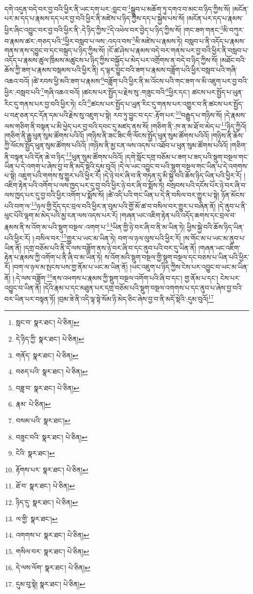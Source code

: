 དགེ་འདུན་བདེ་བར་བྱ་བའི་ཕྱིར་ནི་ཡང་དག་པར་:བླང་བ་\footnote{སླང་བ་  སྣར་ཐང་།  པེ་ཅིན། }སྒྲུབ་པ་མཆོག་ཏུ་དགའ་བ་མང་བ་ཉིད་ཀྱིས་སོ། །མངོན་པར་མ་དད་པ་རྣམས་དད་པར་བྱ་བའི་ཕྱིར་ནི་མཛེས་པ་ཉིད་ཀྱིས་དད་པ་སྐྱེས་པས་སོ། །མངོན་པར་དད་པ་རྣམས་ཕྱིར་ཞིང་འབྱུང་བར་བྱ་བའི་ཕྱིར་ནི་:དེ་ཉིད་ཀྱིས་\footnote{དེ་ཉིད་ཀྱི་  སྣར་ཐང་།  པེ་ཅིན། }དེ་འཕེལ་བར་བྱེད་པ་ཉིད་ཀྱིས་སོ། །གང་ཟག་གནང་\footnote{གནོད་  སྣར་ཐང་།  པེ་ཅིན། }མི་བཀུར་བ་རྣམས་ཚར་:གཅད་པའི་\footnote{བཅད་པའི་  སྣར་ཐང་།  པེ་ཅིན། }ཕྱིར་བསླབ་པ་ལས་:འདའ་བས་\footnote{བཟླ་བ་  སྣར་ཐང་།  པེ་ཅིན། }མི་མཛེས་པ་རྣམས་ཏེ། བསླབ་པ་ནི་འདོད་པ་རྣམས་གནས་ནས་དབྱུང་བ་དང་བསྐྲད་པ་ཉིད་ཀྱིས་སོ། །ངོ་ཚ་ཤེས་པ་རྣམས་བདེ་བར་གནས་པར་བྱ་བའི་ཕྱིར་ནི་བསླབ་པ་འདོད་པ་རྣམས་ཚུལ་ཁྲིམས་མཚུངས་པ་ཉིད་ཀྱིས་བསྐྱོད་པ་མེད་པར་འགྲོགས་ན་བདེ་བ་ཉིད་ཀྱིས་སོ། །མཐོང་བའི་ཆོས་ཀྱི་ཟག་པ་རྣམས་བསྡམས་པའི་ཕྱིར་ནི། ད་ལྟར་བྱུང་བའི་ཟག་པ་རྣམས་བཟློག་པའི་ཕྱིར་བསླབ་པའི་གཞི་འཆའ་བའོ། །ཚེ་རབས་ཕྱི་མའི་ཟག་པ་རྣམས་\footnote{རྣམ་  པེ་ཅིན། }བཟློག་པའི་ཕྱིར་ནི་མ་འོངས་པའི་གང་ཟག་ལ་མི་འཇུག་པར་བྱ་བའི་ཕྱིར་:བསླབ་པའི་\footnote{བསམ་པའི་  སྣར་ཐང་། }གཞི་འཆའ་བའོ། །ཚངས་པར་སྤྱོད་པ་རྗེས་སུ་:གཟུང་བའི་\footnote{བཟུང་བའི་  སྣར་ཐང་།  པེ་ཅིན། }ཕྱིར་དང་། ཚངས་པར་སྤྱོད་པ་ཡུན་རིང་དུ་གནས་པར་བྱ་བའི་ཕྱིར་ཏེ། ངའི་\footnote{ངེའི་  སྣར་ཐང་། }ཚངས་པར་སྤྱོད་པ་ཡུན་རིང་དུ་གནས་པར་འགྱུར་བ་ནི་ཚངས་པར་སྤྱོད་པ་བརྡ་ཅན་དང་དོན་དམ་པའི་རྗེས་སུ་འཇུག་པ་སྟེ། རབ་ཏུ་བྱུང་བ་དང་:རྟོག་པར་\footnote{རྟོགས་པར་  སྣར་ཐང་།  པེ་ཅིན། }བརྒྱུད་པ་གཉིས་སོ། །དེ་རྣམས་ལས་གཅིག་ནི་བསྟན་པ་མི་ཕྱེད་པར་བྱ་བའི་དབང་དུ་མཛད་ནས་སོ། །གཅིག་ནི་:ཁ་ན་མ་ཐོ་བ་མེད་པ་\footnote{ཐོ་བ་  སྣར་ཐང་།  པེ་ཅིན། }ཉིད་ཀྱིའོ། །གཅིག་ནི་རྒྱུ་ཕུན་སུམ་ཚོགས་པའིའོ། །གཉིས་ནི་ཟང་ཟིང་གི་ལོངས་སྤྱོད་ཕུན་སུམ་ཚོགས་པའིའོ། །གཉིས་ནི་ཆོས་ཀྱི་ལོངས་སྤྱོད་ཕུན་སུམ་ཚོགས་པའིའོ། །གཉིས་ནི་མྱ་ངན་ལས་འདས་པ་འཐོབ་པ་ཕུན་སུམ་ཚོགས་པའིའོ། །གཅིག་ནི་བསྟན་པའི་དོན་ཆེ་བ་ཉིད་\footnote{ཉིད་དུ་  སྣར་ཐང་།  པེ་ཅིན། }ཕུན་སུམ་ཚོགས་པའིའོ། །དགེ་སློང་དགྲ་བཅོམ་པ་ཟག་པ་ཟད་པའི་སྡུག་བསྔལ་གང་ཡིན་པ་དེ་འགག་པ་ཞེས་བྱ་བ་ནི་མདོ་སྡེའི་དུམ་བུའོ། །དེ་ལ་ཡང་འབྱུང་བ་པའི་སྡུག་བསྔལ་གང་ཡིན་པ་དེ་འགགས་པ་སྟེ། འཇུག་པའི་གགས་སུ་གྱུར་པའི་ཕྱིར་རོ། །དེ་ཉེ་བར་ཞི་བ་ནི་གཏན་དུ་མི་སྐྱེ་བའི་ཆོས་ཉིད་ཡིན་པའི་ཕྱིར་རོ། །འཇིག་རྟེན་པའི་འགོག་པ་ལས་ཁྱད་པར་དུ་བྱ་བའི་ཕྱིར་ཉེ་བར་ཞི་བ་སྨོས་ཏེ། བསྲབས་པའི་དངོས་པོར་ཉེ་བར་ཞི་བ་ལས་ཁྱད་པར་དུ་བྱ་བའི་ཕྱིར་འགོག་པ་སྨོས་སོ། །ཚེ་འདི་པའི་གང་ཡིན་པ་དེ་ནི་བསིལ་བར་གྱུར་པ་སྟེ། ཉོན་མོངས་པའི་བག་ལ་\footnote{ལ་གྱི་  སྣར་ཐང་། }ཉལ་གྱི་དྲོད་དང་བྲལ་བའི་ཕྱིར་ན་བུམ་པའི་གྱོ་མོ་ཚ་བ་བསིལ་བར་གྱུར་པ་བཞིན་ནོ། །དེ་ནུབ་པ་ནི་ཕུང་པོའི་ལྷག་མ་མེད་པའི་མྱ་ངན་ལས་འདས་པར་རོ། །གཞན་ཡང་འཇིག་རྟེན་པའི་འདོད་ཆགས་དང་བྲལ་བ་རྣམས་ནི་ས་འོག་མ་པའི་སྡུག་བསྔལ་:འགག་པ་\footnote{འགགས་པ་  སྣར་ཐང་།  པེ་ཅིན། }ཡིན་གྱི་ཉེ་བར་ཞི་བ་ནི་མ་ཡིན་ཏེ། ཕྱིས་སྐྱེ་བའི་ཆོས་ཉིད་ཡིན་པའི་ཕྱིར་རོ། །:བསིལ་བར་\footnote{གསིལ་བར་  སྣར་ཐང་།  པེ་ཅིན། }གྱུར་པ་ཡང་མ་ཡིན་ཏེ། བག་ལ་ཉལ་ལུས་པའི་ཕྱིར་རོ། །ས་གོང་མ་པ་ཡང་མ་ནུབ་པ་ཡིན་ནོ། །དགྲ་བཅོམ་པའི་ནི་དེ་ལས་བཟློག་ནས་ཉེ་བར་ཞི་བ་དང་ནུབ་པའི་བར་དུ་ཡིན་ནོ། །གཞན་ཡང་འཇིག་རྟེན་པ་རྣམས་ཀྱི་འགོག་པ་ནི་ཞི་བ་མ་ཡིན་ཏེ། ས་འོག་མའི་སྡུག་བསྔལ་གྱི་སྡུག་བསྔལ་དང་བཅས་པ་ཡིན་པའི་ཕྱིར་རོ། །བག་ལ་ཉལ་མ་སྤངས་པས་གྱ་ནོམ་པ་ཡང་མ་ཡིན་ནོ། །ཡང་འཇུག་པ་ཉིད་ཀྱིས་ངེས་པར་འབྱུང་བ་ཡང་མ་ཡིན་ནོ། །:དེ་ལས་བཟློག་\footnote{དེ་ལས་ལོག་  སྣར་ཐང་།  པེ་ཅིན། }ནས་འཕགས་པ་རྣམས་ཀྱི་སྡུག་བསྔལ་འགོག་པའི་ཞི་བ་དང་། གྱ་ནོམ་པ་དང་། ངེས་པར་འབྱུང་བ་ཡིན་ནོ། །དེའི་རྣམ་པ་དང་མཐུན་པར་དགྲ་བཅོམ་པའི་སྡུག་བསྔལ་འགགས་པ་དང་ནུབ་པ་ཞེས་བྱ་བའི་བར་ཡིན་པར་བསྟན་ཏོ། །བྲམ་ཟེ་ནི་འདི་ལྟ་སྟེ་སོམ་ཉི་མེད་ཅིང་ཞེས་བྱ་བ་ནི་མདོ་སྡེའི་:དུམ་བུའོ།\footnote{དུམ་བུ་སྟེ།  སྣར་ཐང་།  པེ་ཅིན། } 